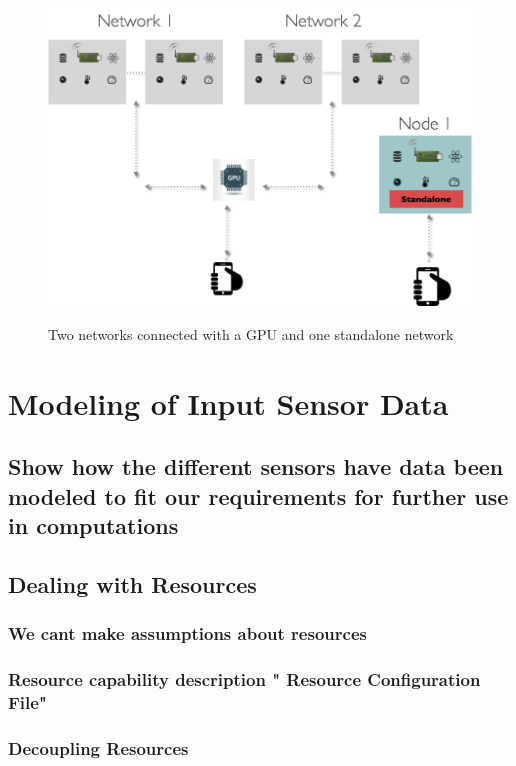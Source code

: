 \begin{figure}[H]
	\centering
	\includegraphics[scale=0.5]{images/system.png}
	\label{fig:system}
	\caption{Two networks connected with a GPU and one standalone network}
\end{figure}






\section{Modeling of Input Sensor Data}
\subsection{Show how the different sensors have data been modeled to fit our requirements for further use in computations}
\subsection{Dealing with Resources}
\subsubsection{We cant make assumptions about resources}
\subsubsection{Resource capability description " Resource Configuration File"}
\subsubsection{Decoupling Resources}



